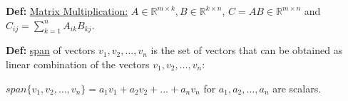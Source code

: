 \documentclass{report}
\begin{document}
\textbf{Def:} \underline{Matrix Multiplication:} $A \in \mathbb{R}^{m \times k}, B \in \mathbb{R}^{k \times n}$,
$C = AB \in \mathbb{R}^{m \times n}$ and $C_{ij} = \sum_{k=1}^{n} A_{ik}B_{kj}$.

\textbf{Def:} \underline{span} of vectors $v_1, v_2, \dots, v_n$ is the set of vectors that can be obtained as
linear combination of the vectors $v_1, v_2, \dots, v_n$:

$span\{v_1, v_2, \dots, v_n\} = a_1v_1 + a_2v_2 + \dots + a_nv_n$ for $a_1, a_2, \dots, a_n$ are scalars.
\end{document}

